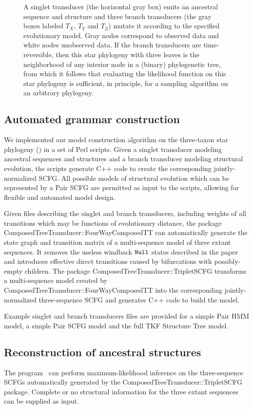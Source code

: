 \documentclass[10pt]{article}
\begin{document}
\begin{figure}[!ht]
{     A singlet transducer (the horizontal gray box) emits an ancestral sequence and structure
     and three branch transducers (the gray boxes labeled $T_X$, $T_Y$ and $T_Z$)
     mutate it according to the specified evolutionary model.
     Gray nodes correspond to observed data and white nodes unobserved data.
     If the branch transducers are time-reversible, then this star phylogeny with three leaves is
     the neighborhood of any interior node in a (binary) phylogenetic tree, 
     from which it follows that evaluating the likelihood function
     on this star phylogeny is sufficient, in principle, for a sampling algorithm on an arbitrary phylogeny.
   }
 \end{figure}

\subsection{Automated grammar construction}
We implemented our model construction algorithm on the three-taxon star phylogeny () 
in a set of Perl scripts.
Given a singlet transducer modeling ancestral sequences and structures and
a branch transducer modeling structural evolution,
the scripts generate C++ code to create the corresponding jointly-normalized SCFG.
All possible models of structural evolution which can be represented by a Pair SCFG
are permitted as input to the scripts,
allowing for flexible and automated model design.

Given files describing the singlet and branch transducers,
including weights of all transitions which may be functions of evolutionary distance,
the package ComposedTreeTransducer::FourWayComposedTT can automatically generate
the state graph and transition matrix of a multi-sequence model of three extant sequences.
It removes the useless windback $\mathtt{Null}$ states described in the paper and
introduces effective direct transitions caused by bifurcations with possibly-empty children.
The package ComposedTreeTransducer::TripletSCFG transforms a multi-sequence
model created by ComposedTreeTransducer::FourWayComposedTT into the 
corresponding jointly-normalized three-sequence SCFG
and generates C++ code to build the model.

Example singlet and branch transducers files are provided for a simple 
Pair HMM model, a simple Pair SCFG model and the full TKF Structure Tree model.

\subsection{Reconstruction of ancestral structures}
The program \indiegram\ can perform maximum-likelihood inference on the
three-sequence SCFGs automatically generated by the ComposedTreeTransducer::TripletSCFG package.
Complete or no structural information for the three extant sequences can be supplied
as input.
\end{document}
